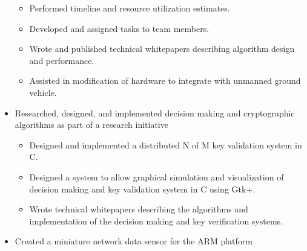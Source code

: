 \documentclass[margin,line]{resume}
\begin{document}
\begin{resume}
\begin{itemize}
\begin{itemize}
        \item Performed timeline and resource utilization estimates.
        \item Developed and assigned tasks to team members.
        \item Wrote and published technical whitepapers describing algorithm design and
              performance.
        \item Assisted in modification of hardware to integrate with unmanned
              ground vehicle.
        \end{itemize}
    \item Researched, designed, and implemented decision making and
          cryptographic algorithms as part of a research initiative
        \begin{itemize}
        \item Designed and implemented a distributed N of M key
              validation system in C.
        \item Designed a system to allow graphical simulation and visualization
              of decision making and key validation system in C using Gtk+.
        \item Wrote technical whitepapers describing the algorithms and
              implementation of the decision making and key verification
              systems.
        \end{itemize}
    \item Created a miniature network data sensor for the ARM platform
        \begin{itemize}

\end{itemize}
\end{itemize}
\end{resume}
\end{document}
